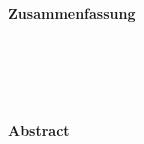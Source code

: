 %
% 

\chapter*{\ }


\begin{otherlanguage}{ngerman}
	\begin{center}
		\begin{large}
			\textbf{Zusammenfassung}
		\end{large}
	\end{center}
	\vspace{0.75em}

	\blindtext[3]
\end{otherlanguage}
\acresetall

\cleardoublepage
\chapter*{\ }
\acresetall

\begin{center}
	\begin{large}
		\textbf{Abstract}
	\end{large}
\end{center}
\vspace{0.75em}

\blindtext[3]
\acresetall




